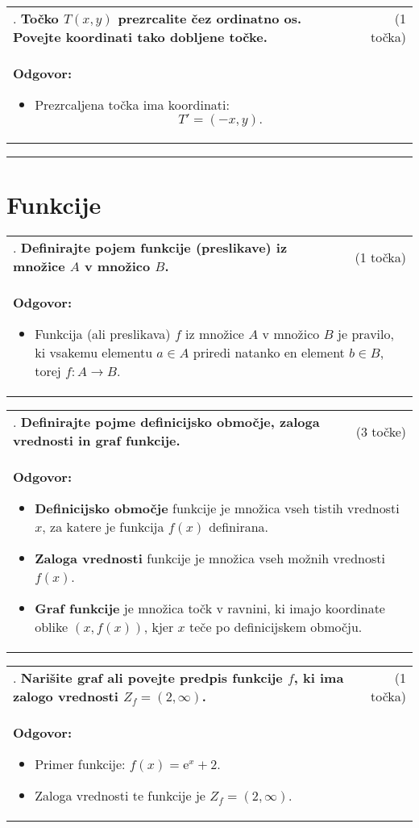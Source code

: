 \documentclass[12pt]{article}
\newcounter{vprasanje}[section]
\renewcommand{\thevprasanje}{\roman{vprasanje}}
\newcommand{\vprasanje}[2]{%
  \stepcounter{vprasanje}%
  \textbf{\thevprasanje}. \textbf{#1} & (#2) \\
}
\newcommand{\odgovor}[1]{%
  \multicolumn{2}{p{\dimexpr\textwidth-2\tabcolsep\relax}}{%
    \small \textbf{Odgovor:} #1%
  } \\[1em]%
}
\newcommand{\crta}{\rule{\textwidth}{0.4pt}}
\newcommand{\naslov}[1]{%
  \vspace{1em} 
  \section{#1}
  \addcontentsline{toc}{section}{\protect\numberline{}#1}%
}
\newcommand{\razmak}[1]{%
  \vspace{#1}
}
\begin{document}
\begin{tabularx}{\textwidth}{X r}
\vprasanje{Točko $T(x, y)$ prezrcalite čez ordinatno os. Povejte koordinati tako dobljene točke.}{1 točka}
\odgovor{
\begin{itemize}
  \item Prezrcaljena točka ima koordinati:
  \[
  T' = (-x, y).
  \]
\end{itemize}
}
\end{tabularx}

\razmak{0.5em}


\crta

\naslov{Funkcije}

\begin{tabularx}{\textwidth}{X r}
\vprasanje{Definirajte pojem funkcije (preslikave) iz množice $A$ v množico $B$.}{1 točka}
\odgovor{
\begin{itemize}
  \item Funkcija (ali preslikava) $f$ iz množice $A$ v množico $B$ je pravilo, ki vsakemu elementu $a \in A$ priredi natanko en element $b \in B$, torej $f: A \to B$.
\end{itemize}
}
\end{tabularx}

\begin{tabularx}{\textwidth}{X r}
\vprasanje{Definirajte pojme definicijsko območje, zaloga vrednosti in graf funkcije.}{3 točke}
\odgovor{
\begin{itemize}
  \item \textbf{Definicijsko območje} funkcije je množica vseh tistih vrednosti $x$, za katere je funkcija $f(x)$ definirana.
  \item \textbf{Zaloga vrednosti} funkcije je množica vseh možnih vrednosti $f(x)$.
  \item \textbf{Graf funkcije} je množica točk v ravnini, ki imajo koordinate oblike $(x, f(x))$, kjer $x$ teče po definicijskem območju.
\end{itemize}
}
\end{tabularx}

\begin{tabularx}{\textwidth}{X r}
\vprasanje{Narišite graf ali povejte predpis funkcije $f$, ki ima zalogo vrednosti $Z_f=(2, \infty)$.}{1 točka}
\odgovor{
\begin{itemize}
  \item Primer funkcije: $f(x) = \mathrm{e}^x + 2$.
  \item Zaloga vrednosti te funkcije je $Z_f = (2, \infty)$.
\end{itemize}
}
\end{tabularx}
\end{document}
